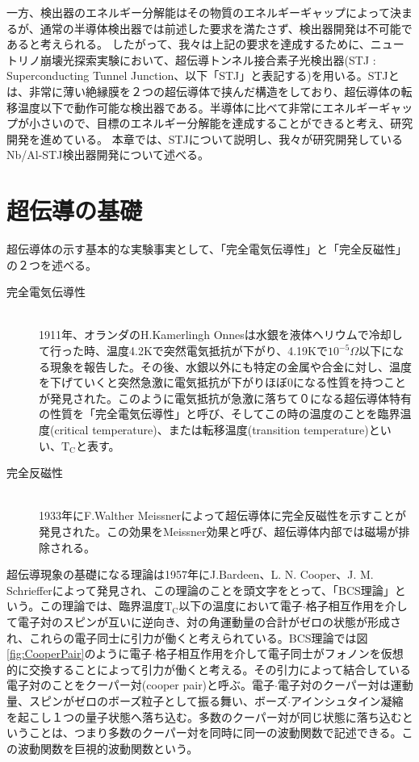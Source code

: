 一方、検出器のエネルギー分解能はその物質のエネルギーギャップによって決まるが、通常の半導体検出器では前述した要求を満たさず、検出器開発は不可能であると考えられる。
したがって、我々は上記の要求を達成するために、ニュートリノ崩壊光探索実験において、超伝導トンネル接合素子光検出器(STJ : Superconducting Tunnel Junction、以下「STJ」と表記する)を用いる。STJとは、非常に薄い絶縁膜を２つの超伝導体で挟んだ構造をしており、超伝導体の転移温度以下で動作可能な検出器である。半導体に比べて非常にエネルギーギャップが小さいので、目標のエネルギー分解能を達成することができると考え、研究開発を進めている。
本章では、STJについて説明し、我々が研究開発しているNb/Al-STJ検出器開発について述べる。
\section{超伝導の基礎}
超伝導体の示す基本的な実験事実として、「完全電気伝導性」と「完全反磁性」の２つを述べる。
	\begin{description}
	\item[完全電気伝導性]\mbox{}\\
		1911年、オランダのH.Kamerlingh Onnesは水銀を液体ヘリウムで冷却して行った時、温度4.2Kで突然電気抵抗が下がり、4.19Kで$10^{-5} \Omega$以下になる現象を報告した。その後、水銀以外にも特定の金属や合金に対し、温度を下げていくと突然急激に電気抵抗が下がりほぼ0になる性質を持つことが発見された。このように電気抵抗が急激に落ちて０になる超伝導体特有の性質を「完全電気伝導性」と呼び、そしてこの時の温度のことを臨界温度(critical temperature)、または転移温度(transition temperature)といい、$\mathrm{T_C}$と表す。
	\item[完全反磁性]\mbox{}\\
		1933年にF.Walther Meissnerによって超伝導体に完全反磁性を示すことが発見された。この効果をMeissner効果と呼び、超伝導体内部では磁場が排除される。
	\end{description}
	
超伝導現象の基礎になる理論は1957年にJ.Bardeen、L. N. Cooper、J. M. Schriefferによって発見され、この理論のことを頭文字をとって、「BCS理論」という。この理論では、臨界温度$\mathrm{T_C}$以下の温度において電子$\cdot$格子相互作用を介して電子対のスピンが互いに逆向き、対の角運動量の合計がゼロの状態が形成され、これらの電子同士に引力が働くと考えられている。BCS理論では図\ref{fig:CooperPair}のように電子$\cdot$格子相互作用を介して電子同士がフォノンを仮想的に交換することによって引力が働くと考える。その引力によって結合している電子対のことをクーパー対(cooper pair)と呼ぶ。電子$\cdot$電子対のクーパー対は運動量、スピンがゼロのボーズ粒子として振る舞い、ボーズ$\cdot$アインシュタイン凝縮を起こし１つの量子状態へ落ち込む。多数のクーパー対が同じ状態に落ち込むということは、つまり多数のクーパー対を同時に同一の波動関数で記述できる。この波動関数を巨視的波動関数という。

